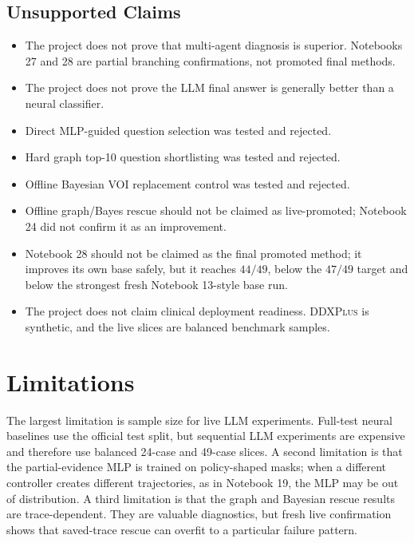 \documentclass[11pt]{article}
\newcommand{\ddx}{\textsc{DDXPlus}}
\newcommand{\mlp}{\textsc{MLP}}
\newcommand{\llm}{\textsc{LLM}}
\begin{document}
\subsection{Unsupported Claims}

\begin{itemize}[leftmargin=*]
    \item The project does not prove that multi-agent diagnosis is superior. Notebooks 27 and 28 are partial branching confirmations, not promoted final methods.
    \item The project does not prove the \llm{} final answer is generally better than a neural classifier.
    \item Direct MLP-guided question selection was tested and rejected.
    \item Hard graph top-10 question shortlisting was tested and rejected.
    \item Offline Bayesian VOI replacement control was tested and rejected.
    \item Offline graph/Bayes rescue should not be claimed as live-promoted; Notebook 24 did not confirm it as an improvement.
    \item Notebook 28 should not be claimed as the final promoted method; it improves its own base safely, but it reaches $44/49$, below the $47/49$ target and below the strongest fresh Notebook 13-style base run.
    \item The project does not claim clinical deployment readiness. \ddx{} is synthetic, and the live slices are balanced benchmark samples.
\end{itemize}

\section{Limitations}

The largest limitation is sample size for live \llm{} experiments. Full-test neural baselines use the official test split, but sequential \llm{} experiments are expensive and therefore use balanced 24-case and 49-case slices. A second limitation is that the partial-evidence \mlp{} is trained on policy-shaped masks; when a different controller creates different trajectories, as in Notebook 19, the \mlp{} may be out of distribution. A third limitation is that the graph and Bayesian rescue results are trace-dependent. They are valuable diagnostics, but fresh live confirmation shows that saved-trace rescue can overfit to a particular failure pattern.
\end{document}
